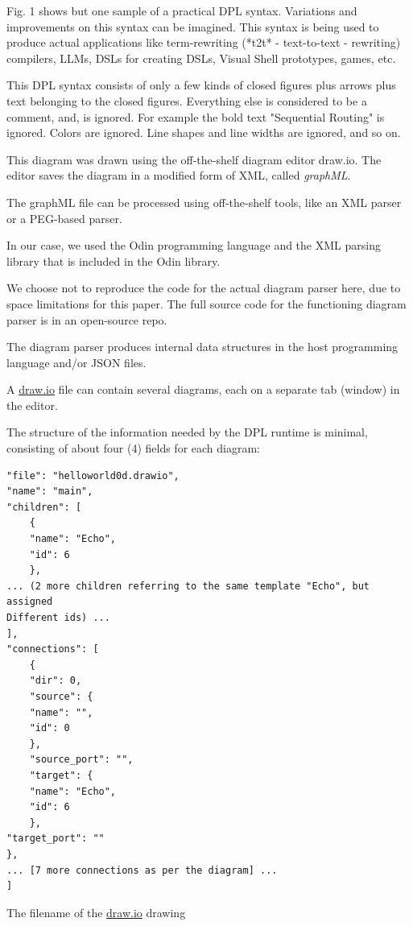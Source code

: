 \documentclass[10pt]{acmart}
\begin{document}
Fig. 1 shows but one sample of a practical DPL syntax. Variations and
improvements on this syntax can be imagined. This syntax is being used
to produce actual applications like term-rewriting (*t2t* -
text-to-text - rewriting) compilers, LLMs, DSLs for creating DSLs,
Visual Shell prototypes, games, etc.

This DPL syntax consists of only a few kinds of closed figures plus
arrows plus text belonging to the closed figures. Everything else is
considered to be a comment, and, is ignored. For example the bold text
"Sequential Routing" is ignored. Colors are ignored. Line shapes and
line widths are ignored, and so on.

This diagram was drawn using the off-the-shelf diagram editor
draw.io\cite{diagrams_net}. The editor saves the diagram in a modified form of XML, called \emph{graphML}\cite{graphml}.

The graphML file can be processed using off-the-shelf tools, like an XML parser or a PEG\cite{peg}-based parser\cite{ohmjs}.

In our case, we used the Odin programming language\cite{odin} and the XML parsing library that is included in the Odin library.

We choose not to reproduce the code for the actual diagram parser here, due to space limitations for this paper. The full source code for the functioning diagram parser is in an open-source repo\cite{d2j}.

The diagram parser produces internal data structures in the host programming language and/or JSON\cite{json} files.

A \href{http://draw.io}{draw.io} file can contain several diagrams, each on a separate tab (window) in the editor.

The structure of the information needed by the DPL runtime is minimal, consisting of about four (4) fields for each diagram:

\begin{verbatim}
"file": "helloworld0d.drawio",
"name": "main",
"children": [
    {
    "name": "Echo",
    "id": 6
    },
... (2 more children referring to the same template "Echo", but assigned
Different ids) ...
],
"connections": [
    {
    "dir": 0,
    "source": {
    "name": "",
    "id": 0
    },
    "source_port": "",
    "target": {
    "name": "Echo",
    "id": 6
    },
"target_port": ""
},
... [7 more connections as per the diagram] ...
]
\end{verbatim}

The filename of the \href{http://draw.io}{draw.io} drawing
\end{document}
